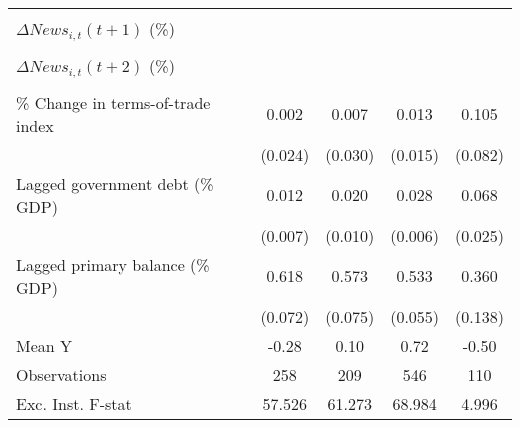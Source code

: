 {\begin{tabular}{l*{4}{c}}
                    &                     &                     &                     &                     \\
\addlinespace
$ \Delta News_{i,t}(t+1)$ (\%)&                     &                     &                     &                     \\
                    &                     &                     &                     &                     \\
\addlinespace
$ \Delta News_{i,t}(t+2)$ (\%)&                     &                     &                     &                     \\
                    &                     &                     &                     &                     \\
\addlinespace
\% Change in terms-of-trade index&       0.002         &       0.007         &       0.013         &       0.105         \\
                    &     (0.024)         &     (0.030)         &     (0.015)         &     (0.082)         \\
\addlinespace
Lagged government debt (\% GDP)&       0.012\sym{*}  &       0.020\sym{*}  &       0.028\sym{***}&       0.068\sym{***}\\
                    &     (0.007)         &     (0.010)         &     (0.006)         &     (0.025)         \\
\addlinespace
Lagged primary balance (\% GDP)&       0.618\sym{***}&       0.573\sym{***}&       0.533\sym{***}&       0.360\sym{***}\\
                    &     (0.072)         &     (0.075)         &     (0.055)         &     (0.138)         \\
\midrule
Mean Y              &       -0.28         &        0.10         &        0.72         &       -0.50         \\
Observations        &         258         &         209         &         546         &         110         \\
Exc. Inst. F-stat   &      57.526         &      61.273         &      68.984         &       4.996         \\
\bottomrule
\end{tabular}
}
